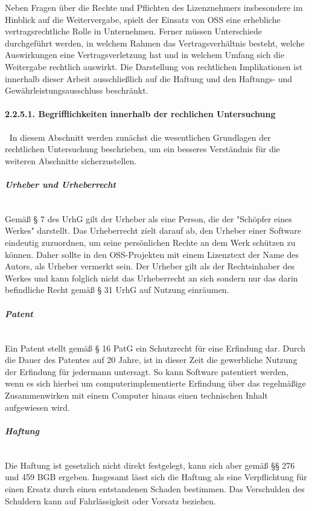 Neben Fragen über die Rechte und Pflichten des Lizenznehmers insbesondere im Hinblick auf die Weitervergabe, spielt der Einsatz von OSS eine erhebliche vertragsrechtliche Rolle in Unternehmen. Ferner müssen Unterschiede durchgeführt werden, in welchem Rahmen das Vertragsverhältnis besteht, welche Auswirkungen eine Vertragsverletzung hat und in welchem Umfang sich die Weitergabe rechtlich auswirkt. Die Darstellung von rechtlichen Implikationen ist innerhalb dieser Arbeit ausschließlich auf die Haftung und den Haftungs- und Gewährleistungsausschluss beschränkt. 

\paragraph{2.2.5.1. Begrifflichkeiten innerhalb der rechlichen Untersuchung} $~$
In diesem Abschnitt werden zunächst die wesentlichen Grundlagen der rechtlichen Untersuchung beschrieben, um ein besseres Verständnis für die weiteren Abschnitte sicherzustellen. 

\subparagraph{Urheber und Urheberrecht}$~$

Gemäß § 7 des UrhG gilt der Urheber als eine Person, die der "Schöpfer eines Werkes" darstellt. Das Urheberrecht zielt darauf ab, den Urheber einer Software eindeutig zuzuordnen, um seine persönlichen Rechte an dem Werk schützen zu können. Daher sollte in den OSS-Projekten mit einem Lizenztext der Name des Autors, als Urheber vermerkt sein. \cite[S. 45]{bitkom_open_2016}  Der Urheber gilt als der Rechtsinhaber des Werkes und kann folglich nicht das Urheberrecht an sich sondern nur das darin befindliche Recht gemäß § 31 UrhG auf Nutzung einräumen. 

\subparagraph{Patent}$~$

Ein Patent stellt gemäß § 16 PatG ein Schutzrecht für eine Erfindung dar. Durch die Dauer des Patentes auf 20 Jahre, ist in dieser Zeit die gewerbliche Nutzung der Erfindung für jedermann untersagt. So kann Software patentiert werden, wenn es sich hierbei um computerimplementierte Erfindung über das regelmäßige Zusammenwirken mit einem Computer hinaus einen technischen Inhalt aufgewiesen wird. \cite[S. 51]{bitkom_open_2016} 

\subparagraph{Haftung}$~$

Die Haftung ist gesetzlich nicht direkt festgelegt, kann sich aber gemäß §§ 276 und 459 BGB ergeben. Insgesamt lässt sich die Haftung als eine Verpflichtung für einen Ersatz durch einen entstandenen Schaden bestimmen. Das Verschulden des Schuldern kann auf Fahrlässigkeit oder Vorsatz beziehen. 

